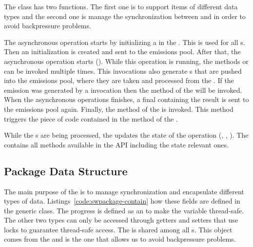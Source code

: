 \documentclass[type=bsc,accentcolor=tud9c]{tudthesis}
\begin{document}
The class  has two functions. The first one is to support items of different data types and the second one is manage the synchronization between  and  in order to avoid backpressure problems. 

The asynchronous operation starts by initializing a  in the . This  is used for all s. Then an initialization  is created and sent to the emissions pool. After that, the asynchronous operation starts (). While this operation is running, the methods  or  can be invoked multiple times. This invocations also generate s that are pushed into the emissions pool, where they are taken and processed from the . If the emission was generated by a  invocation then the  method of the  will be invoked. When the asynchronous operations finishes, a final  containing the result is sent to the emissions pool again. Finally, the  method of the  is invoked. This method triggers the piece of code contained in the  method of the .

While the s are being processed, the  updates the state of the operation (, , ). The  contains all methods available in the  API including the state relevant ones.

\subsection{Package Data Structure}
\label{sec:imp-package}
The main purpose of the  is to manage synchronization and encapsulate different types of data. Listings~\ref{code:swpackage-contain} how these fields are defined in the generic class. The progress is defined as an  to make the variable thread-safe. The other two types can only be accessed through getters and setters that use locks to guarantee thread-safe access. The  is shared among all s. This object comes from the  and is the one that allows us to avoid backpressure problems.


\end{document}
